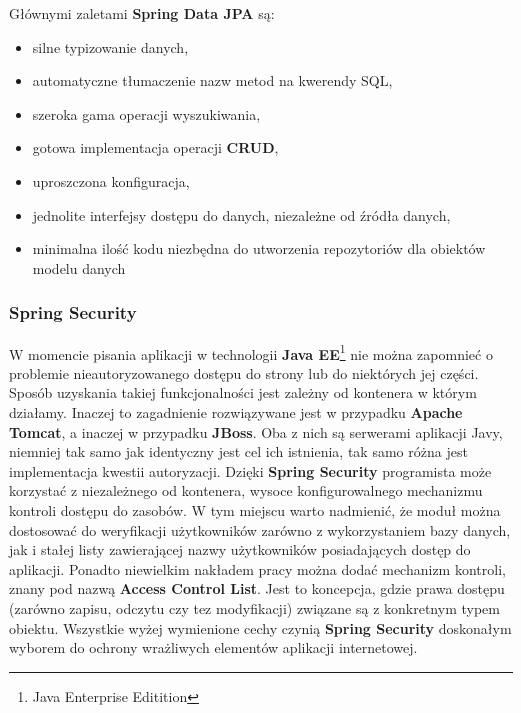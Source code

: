 		Głównymi zaletami \textbf{Spring Data JPA} są:
		\begin{itemize}
			\item silne typizowanie danych,
			\item automatyczne tłumaczenie nazw metod na kwerendy SQL,
			\item szeroka gama operacji wyszukiwania,
			\item gotowa implementacja operacji \textbf{CRUD},
			\item uproszczona konfiguracja,
			\item jednolite interfejsy dostępu do danych, niezależne od źródła danych,
			\item minimalna ilość kodu niezbędna do utworzenia repozytoriów dla obiektów modelu danych
		\end{itemize}
		
		\subsubsection{Spring Security}	
		W momencie pisania aplikacji w technologii \textbf{Java EE}\footnote{Java Enterprise Editition} nie można zapomnieć o problemie nieautoryzowanego dostępu do strony lub do niektórych jej części. Sposób uzyskania takiej funkcjonalności jest zależny od kontenera w którym działamy. Inaczej to zagadnienie rozwiązywane jest w przypadku \textbf{Apache Tomcat}, a inaczej w przypadku \textbf{JBoss}. Oba z nich są serwerami aplikacji Javy, niemniej tak samo jak identyczny jest cel ich istnienia, tak samo różna jest implementacja kwestii autoryzacji. Dzięki \textbf{Spring Security} programista może korzystać z niezależnego od kontenera, wysoce konfigurowalnego mechanizmu kontroli dostępu do zasobów. W tym miejscu warto nadmienić, że moduł można dostosować do weryfikacji użytkowników zarówno z wykorzystaniem bazy danych, jak i stałej listy zawierającej nazwy użytkowników posiadających dostęp do aplikacji. Ponadto niewielkim nakładem pracy można dodać mechanizm kontroli, znany pod nazwą \textbf{Access Control List}. Jest to koncepcja, gdzie prawa dostępu (zarówno zapisu, odczytu czy tez modyfikacji) związane są z konkretnym typem obiektu. Wszystkie wyżej wymienione cechy czynią \textbf{Spring Security} doskonałym wyborem do ochrony wrażliwych elementów aplikacji internetowej. 
		
